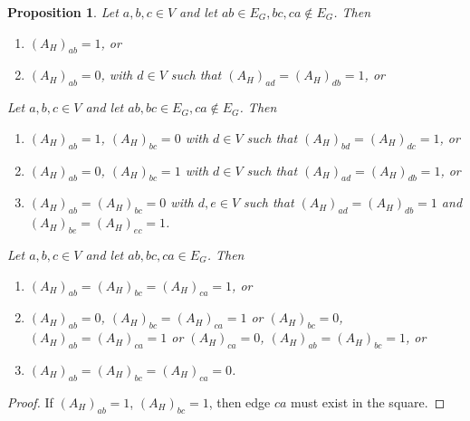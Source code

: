 \documentclass[11pt]{article}
\newtheorem{proposition}{Proposition}
\begin{document}
\begin{proposition}
    Let $a,b,c \in V$ and let $ab \in E_G, bc, ca \notin E_G$. Then 
    \begin{enumerate}
        \item $(A_H)_{ab} = 1$, or
        \item $(A_H)_{ab} = 0$, with $d \in V$ such that $(A_H)_{ad} = (A_H)_{db} = 1$, or 
    \end{enumerate}
    Let $a,b,c \in V$ and let $ab, bc \in E_G, ca \notin E_G$. Then 
    \begin{enumerate}
        \item $(A_H)_{ab} = 1$, $(A_H)_{bc} = 0$ with $d \in V$ such that $(A_H)_{bd} = (A_H)_{dc} = 1$, or
        \item $(A_H)_{ab} = 0$, $(A_H)_{bc} = 1$ with $d \in V$ such that $(A_H)_{ad} = (A_H)_{db} = 1$, or 
        \item $(A_H)_{ab} = (A_H)_{bc} = 0$ with $d, e \in V$ such that $(A_H)_{ad} = (A_H)_{db} = 1$ and
         $(A_H)_{be} = (A_H)_{ec} = 1$. 
    \end{enumerate}
    Let $a,b,c \in V$ and let $ab, bc, ca \in E_G$. Then 
    \begin{enumerate}
        \item $(A_H)_{ab} = (A_H)_{bc} = (A_H)_{ca} = 1$, or
        \item $(A_H)_{ab} = 0$, $(A_H)_{bc} = (A_H)_{ca} = 1$ or $(A_H)_{bc} = 0$, $(A_H)_{ab} = (A_H)_{ca} = 1$ or 
        $(A_H)_{ca} = 0$, $(A_H)_{ab} = (A_H)_{bc} = 1$, or
        \item $(A_H)_{ab} = (A_H)_{bc} = (A_H)_{ca} =  0$. 
    \end{enumerate}
\end{proposition}

\begin{proof}
    If $(A_H)_{ab} = 1$, $(A_H)_{bc} = 1$, then edge $ca$ must exist in the square. 
\end{proof}


\printbibliography
\end{document}
